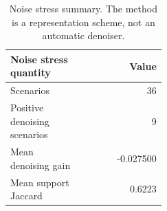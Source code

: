 \begin{table}[H]
\centering
\small
\begin{tabular}{L{0.45\linewidth}r}
\toprule
Noise stress quantity & Value\\
\midrule
Scenarios & 36\\
Positive denoising scenarios & 9\\
Mean denoising gain & -0.027500\\
Mean support Jaccard & 0.6223\\
\bottomrule
\end{tabular}
\caption{Noise stress summary. The method is a representation scheme, not an automatic denoiser.}
\label{tab:noise-summary}
\end{table}
